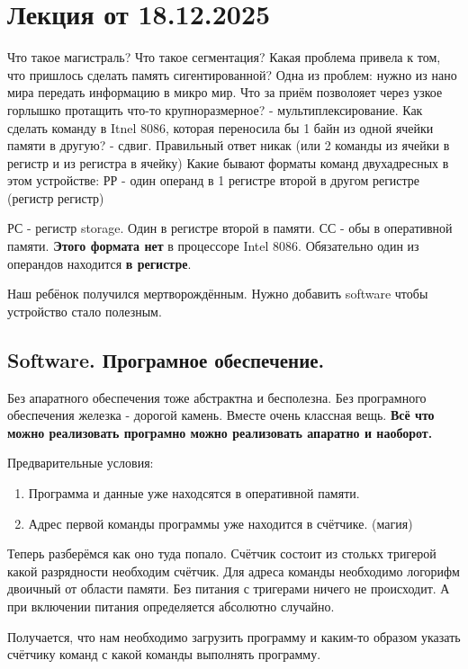 \documentclass[12px]{article}
\begin{document}
\section{Лекция от 18.12.2025}

Что такое магистраль?
Что такое сегментация?
Какая проблема привела к том, что пришлось сделать память сигентированной?
Одна из проблем: нужно из нано мира передать информацию в микро мир. 
Что за приём позволояет через узкое горлышко протащить что-то крупноразмерное? - мультиплексирование. 
Как сделать команду в Itnel 8086, которая переносила бы 1 байн из одной ячейки памяти в другую? - сдвиг. Правильный ответ никак (или 2 команды из ячейки в регистр и из регистра в ячейку)
Какие бывают форматы команд двухадресных в этом устройстве: 
РР - один операнд в 1 регистре второй в другом регистре (регистр регистр)

РС - регистр storage. Один в регистре второй в памяти. 
СС - обы в оперативной памяти. \textbf{Этого формата нет} в процессоре Intel 8086. 
Обязательно один из операндов находится \textbf{в регистре}.


Наш ребёнок получился мертворождённым. Нужно добавить software чтобы устройство стало полезным. 
\subsection{Software. Програмное обеспечение.}
Без апаратного обеспечения тоже абстрактна и бесполезна. 
Без програмного обеспечения железка - дорогой камень.
Вместе очень классная вещь. 
\textbf{Всё что можно реализовать програмно можно реализовать апаратно и наоборот.}

Предварительные условия: 
\begin{enumerate}
	\item Программа и данные уже находсятся в оперативной памяти. 
	\item Адрес первой команды программы уже находится в счётчике. (магия) 
\end{enumerate}
Теперь разберёмся как оно туда попало. 
Счётчик состоит из столькх тригерой какой разрядности необходим счётчик. Для адреса команды необходимо логорифм двоичный от области памяти. Без питания с тригерами ничего не происходит. А при включении питания определяется абсолютно случайно. 

Получается, что нам необходимо загрузить программу и каким-то образом указать счётчику команд с какой команды выполнять программу. 
\end{document}
